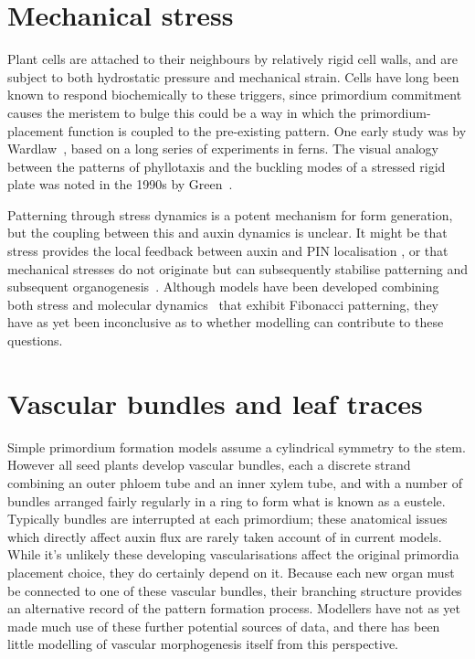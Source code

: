 \section{Mechanical stress}

 Plant cells are attached to their neighbours by relatively rigid cell walls, and are subject to both hydrostatic pressure and mechanical strain. Cells have long been known to respond biochemically to these triggers, since primordium commitment causes the meristem to bulge this could be a way in which the primordium-placement function is coupled to the pre-existing pattern. 
 One early study was by Wardlaw~\autocite{wardlawPhyllotaxisOrganogenesisFerns1949}, based on a long series of experiments in ferns.  The visual analogy between the patterns of phyllotaxis and the buckling modes of a stressed rigid plate was noted in the 1990s by Green~\cite{greenPhyllotacticPatternsCharacterization1987}.  
 
  Patterning through stress dynamics is a potent mechanism for form generation,  but the coupling between this and auxin dynamics is unclear.  It might be that stress provides the local feedback between auxin and PIN localisation \autocite{heislerAlignmentPIN1Polarity2010},
   or that mechanical stresses do not originate but can subsequently stabilise patterning and  subsequent organogenesis~\autocite{kuhlemeierPhyllotaxis2017}.  Although models have been developed combining both stress and molecular dynamics~\autocite{pennybackerPhyllotaxisProgressStory2015} that exhibit Fibonacci patterning, they have as yet been inconclusive as to whether modelling can contribute to  these questions.
 
\section{Vascular bundles and leaf traces}
Simple primordium formation models assume a cylindrical symmetry to the stem. However all seed plants develop vascular bundles, each a discrete strand combining an outer phloem tube and an inner xylem tube, and with a number of bundles arranged fairly regularly in a ring to form what is known as a eustele. Typically bundles are interrupted at each primordium; these anatomical issues which directly affect auxin flux are rarely taken account of in current models. While it's unlikely these developing vascularisations affect the original primordia placement choice, they do certainly depend on it. Because each new organ must be connected to one of these vascular bundles, their branching structure provides an alternative record of the pattern formation process. 
Modellers have not as yet made much use of these further potential sources of data, and  there has been little modelling of vascular morphogenesis itself from this perspective.
	


